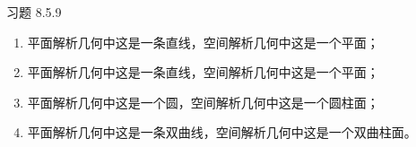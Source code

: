 \begin{problem}
	习题 8.5.9
	\begin{solution}
		\begin{enumerate}
			\item[\textbf{1)}] 平面解析几何中这是一条直线，空间解析几何中这是一个平面；
			\item[\textbf{2)}] 平面解析几何中这是一条直线，空间解析几何中这是一个平面；
			\item[\textbf{3)}] 平面解析几何中这是一个圆，空间解析几何中这是一个圆柱面；
			\item[\textbf{4)}] 平面解析几何中这是一条双曲线，空间解析几何中这是一个双曲柱面。
		\end{enumerate}
	\end{solution}
\end{problem}

